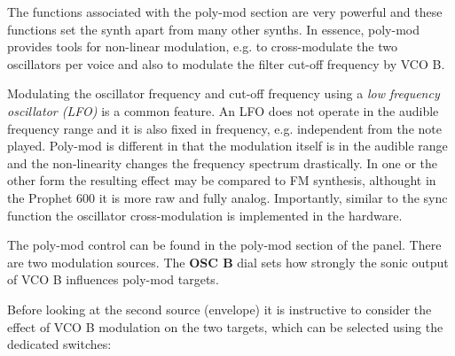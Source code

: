 The functions associated with the poly-mod section are very powerful and these functions set the synth apart from many other synths. In essence, poly-mod provides tools for non-linear modulation, e.g. to cross-modulate the two oscillators per voice and also to modulate the filter cut-off frequency by VCO B. 

Modulating the oscillator frequency and cut-off frequency using a \textit{low frequency oscillator (LFO)} is a common feature. An LFO does not operate in the audible frequency range and it is also fixed in frequency, e.g. independent from the note played. Poly-mod is different in that the modulation itself is in the audible range and the non-linearity changes the frequency spectrum drastically. In one or the other form the resulting effect may be compared to FM synthesis, althought in the Prophet 600 it is more raw and fully analog. Importantly, similar to the sync function the oscillator cross-modulation is implemented in the hardware.

The poly-mod control can be found in the poly-mod section of the panel. There are two modulation sources. The \textbf{OSC B} dial sets how strongly the sonic output of VCO B influences poly-mod targets. 


Before looking at the second source (envelope) it is instructive to consider the effect of VCO B modulation on the two targets, which can be selected using the dedicated switches:


